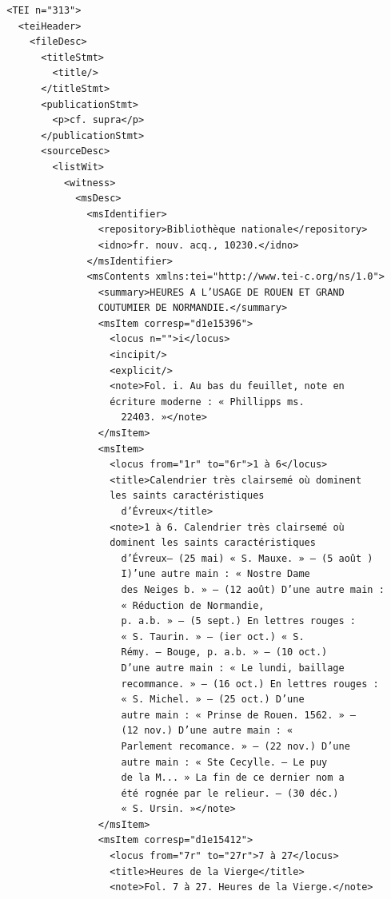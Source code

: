 \documentclass[a4paper,12pt,twoside]{book}
\begin{document}
	\begin{verbatim}
  <TEI n="313">
    <teiHeader>
      <fileDesc>
        <titleStmt>
          <title/>
        </titleStmt>
        <publicationStmt>
          <p>cf. supra</p>
        </publicationStmt>
        <sourceDesc>
          <listWit>
            <witness>
              <msDesc>
                <msIdentifier>
                  <repository>Bibliothèque nationale</repository>
                  <idno>fr. nouv. acq., 10230.</idno>
                </msIdentifier>
                <msContents xmlns:tei="http://www.tei-c.org/ns/1.0">
                  <summary>HEURES A L’USAGE DE ROUEN ET GRAND 
                  COUTUMIER DE NORMANDIE.</summary>
                  <msItem corresp="d1e15396">
                    <locus n="">i</locus>
                    <incipit/>
                    <explicit/>
                    <note>Fol. i. Au bas du feuillet, note en 
                    écriture moderne : « Phillipps ms.
                      22403. »</note>
                  </msItem>
                  <msItem>
                    <locus from="1r" to="6r">1 à 6</locus>
                    <title>Calendrier très clairsemé où dominent 
                    les saints caractéristiques
                      d’Évreux</title>
                    <note>1 à 6. Calendrier très clairsemé où 
                    dominent les saints caractéristiques
                      d’Évreux— (25 mai) « S. Mauxe. » — (5 août ) 
                      I)’une autre main : « Nostre Dame
                      des Neiges b. » — (12 août) D’une autre main :
                      « Réduction de Normandie,
                      p. a.b. » — (5 sept.) En lettres rouges :
                      « S. Taurin. » — (ier oct.) « S.
                      Rémy. — Bouge, p. a.b. » — (10 oct.) 
                      D’une autre main : « Le lundi, baillage
                      recommance. » — (16 oct.) En lettres rouges :
                      « S. Michel. » — (25 oct.) D’une
                      autre main : « Prinse de Rouen. 1562. » — 
                      (12 nov.) D’une autre main : «
                      Parlement recomance. » — (22 nov.) D’une 
                      autre main : « Ste Cecylle. — Le puy
                      de la M... » La fin de ce dernier nom a
                      été rognée par le relieur. — (30 déc.)
                      « S. Ursin. »</note>
                  </msItem>
                  <msItem corresp="d1e15412">
                    <locus from="7r" to="27r">7 à 27</locus>
                    <title>Heures de la Vierge</title>
                    <note>Fol. 7 à 27. Heures de la Vierge.</note>

\end{verbatim}
\end{document}
